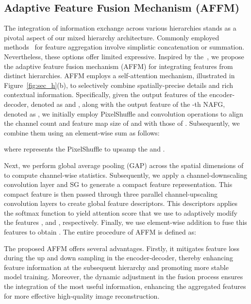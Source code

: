 \documentclass[lettersize,journal]{IEEEtran}
\begin{document}
\subsection{Adaptive Feature Fusion Mechanism (AFFM)}
The integration of information exchange across various hierarchies stands as a pivotal aspect of our mixed hierarchy architecture. Commonly employed methods~\cite{Zamir2021MPRNet,PREnet,RESCAN} for feature aggregation involve simplistic concatenation or summation. Nevertheless, these options offer limited expressive. Inspired by the~\cite{Zamir2022MIRNetv2,li2019selective}, we propose the adaptive feature fusion mechanism (AFFM) for integrating features from distinct hierarchies. AFFM employs a self-attention mechanism, illustrated in Figure~\ref{fig:sec_h}(b), to selectively combine spatially-precise details and rich contextual information. 
Specifically, given the output features of the encoder-decoder, denoted as  and , along with the output feature of the -th NAFG, denoted as , we initially employ PixelShuffle and convolution operations to align the channel count and feature map size of  and  with those of . Subsequently, we combine them using an element-wise sum as follows:

where  represents the PixelShuffle to upsamp the  and .

Next, we perform global average pooling (GAP) across the spatial dimensions of  to compute channel-wise statistics. Subsequently, we apply a channel-downscaling convolution layer and  SG to generate a compact feature representation. This compact feature is then passed through three parallel channel-upscaling convolution layers to create global feature descriptors. This descriptors applies the softmax
function to  yield attention score that we use to adaptively modify the features ,  and , respectively. Finally, we use element-wise addition to fuse this features to obtain . The entire  procedure of AFFM is  defined as:


The proposed AFFM offers several advantages. Firstly, it mitigates feature loss during the up and down sampling  in the encoder-decoder, thereby enhancing feature information at the subsequent hierarchy and promoting more stable model training. Moreover, the dynamic adjustment in the fusion process ensures the integration of the most useful information, enhancing the aggregated features for more effective high-quality image reconstruction.
\end{document}
